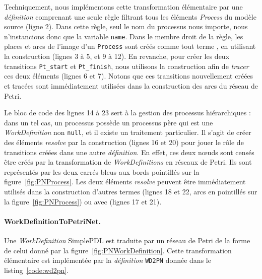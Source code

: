 Techniquement, nous implémentons cette transformation élémentaire par une
\emph{définition} comprenant une seule règle filtrant tous les éléments
\emph{Process} du modèle source (ligne 2). Dans cette règle, seul le nom du
processus nous importe, nous n'instancions donc que la variable \texttt{name}.
Dans le membre droit de la règle, les places et arcs de l'image d'un
\texttt{Process} sont créés comme tout terme {\tom}, en utilisant la
construction  (lignes 3 à 5, et 9 à 12). En revanche, pour créer
les deux transitions \texttt{Pt\_start} et \texttt{Pt\_finish}, nous utilisons
la construction  afin de \emph{tracer} ces deux éléments
(lignes 6 et 7).  Notons que ces transitions nouvellement créées et tracées
sont immédiatement utilisées dans la construction des arcs du réseau de Petri.

Le bloc de code des lignes 14 à 23 sert à la gestion des processus
hiérarchiques : dans un tel cas, un processus possède un processus père qui est
une \emph{WorkDefinition} non \texttt{null}, et il existe un traitement
particulier. Il s'agit de créer des éléments \emph{resolve} par la construction
 (lignes 16 et 20) pour jouer le rôle de transitions créées dans
une autre \emph{définition}. En effet, ces deux nœuds sont censés être créés
par la transformation de \emph{WorkDefinitions} en réseaux de Petri. Ils sont
représentés par les deux carrés bleus aux bords pointillés sur la
figure~\ref{fig:PNProcess}. Les deux éléments \emph{resolve} peuvent être
immédiatement utilisés dans la construction d'autres termes (lignes 18 et 22,
arcs en pointillés sur la figure~\ref{fig:PNProcess}) ou avec {\java} (lignes
17 et 21).

\begin{figure}[h]
  \begin{center}
    
  \end{center}
\end{figure}


\FloatBarrier

\paragraph{WorkDefinitionToPetriNet.} Une \emph{WorkDefinition} SimplePDL est
traduite par un réseau de Petri de la forme de celui donné par la
figure~\ref{fig:PNWorkDefinition}. Cette transformation élémentaire est
implémentée par la \emph{définition} \texttt{WD2PN} donnée dans le
listing~\ref{code:wd2pn}.


